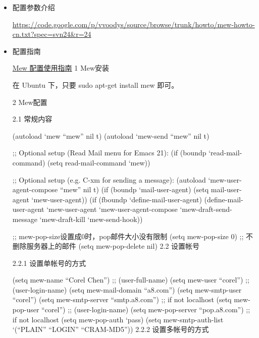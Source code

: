 \documentclass[11pt]{article}
\begin{document}
\begin{itemize}

\item 配置参数介绍\\
\label{sec-1.6.1.1}

\href{https://code.google.com/p/vvoodys/source/browse/trunk/howto/mew-howto-cn.txt?spec=svn24&r=24}{https://code.google.com/p/vvoodys/source/browse/trunk/howto/mew-howto-cn.txt?spec=svn24\&r=24}

\item 配置指南\\
\label{sec-1.6.1.2}

\href{http://zerodoo.appspot.com/emacs.mew.1.0001.html}{Mew 配置使用指南}
1 Mew安装

在 Ubuntu 下，只要 sudo apt-get install mew 即可。

2 Mew配置

2.1 常规内容

(autoload `mew ``mew'' nil t)
(autoload `mew-send ``mew'' nil t)

;; Optional setup (Read Mail menu for Emacs 21):
(if (boundp `read-mail-command)
    (setq read-mail-command `mew))

;; Optional setup (e.g. C-xm for sending a message):
(autoload `mew-user-agent-compose ``mew'' nil t)
(if (boundp `mail-user-agent)
    (setq mail-user-agent `mew-user-agent))
(if (fboundp `define-mail-user-agent)
    (define-mail-user-agent
      `mew-user-agent
      `mew-user-agent-compose
      `mew-draft-send-message
      `mew-draft-kill
      `mew-send-hook))

;; mew-pop-size设置成0时，pop邮件大小没有限制
(setq mew-pop-size 0)
;; 不删除服务器上的邮件
(setq mew-pop-delete nil)
2.2 设置帐号

2.2.1 设置单帐号的方式

(setq mew-name ``Corel Chen'') ;; (user-full-name)
(setq mew-user ``corel'') ;; (user-login-name)
(setq mew-mail-domain ``a8.com'')
(setq mew-smtp-user ``corel'')
(setq mew-smtp-server ``smtp.a8.com'')  ;; if not localhost
(setq mew-pop-user ``corel'')  ;; (user-login-name)
(setq mew-pop-server ``pop.a8.com'')    ;; if not localhost
(setq mew-pop-auth `pass)
(setq mew-smtp-auth-list `(``PLAIN'' ``LOGIN'' ``CRAM-MD5''))
2.2.2 设置多帐号的方式


\end{itemize}
\end{document}
